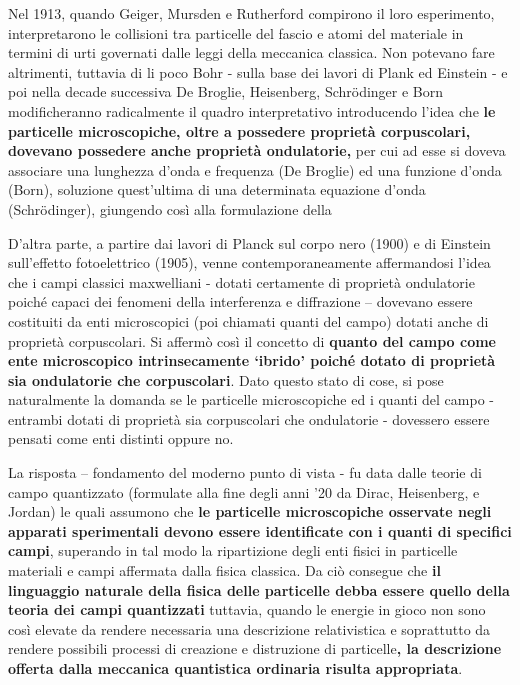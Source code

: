 Nel 1913, quando Geiger, Mursden e Rutherford compirono il loro
esperimento, interpretarono le collisioni tra particelle del fascio e
atomi del materiale in termini di urti governati dalle leggi della
meccanica classica.
Non potevano fare altrimenti, tuttavia di li poco
Bohr - sulla base dei lavori di Plank ed Einstein - e poi nella decade
successiva De Broglie, Heisenberg, Schrödinger e Born modificheranno
radicalmente il quadro interpretativo introducendo l'idea che \textbf{le
particelle microscopiche, oltre a possedere proprietà corpuscolari,
	dovevano possedere anche proprietà ondulatorie,} per cui ad esse si
doveva associare una lunghezza d'onda e frequenza (De Broglie) ed una
funzione d'onda (Born), soluzione quest'ultima di una determinata
equazione d'onda (Schrödinger), giungendo così alla formulazione della

D'altra parte, a partire dai lavori di Planck sul corpo nero (1900) e di
Einstein sull'effetto fotoelettrico (1905), venne contemporaneamente
affermandosi l'idea che i campi classici maxwelliani - dotati certamente
di proprietà ondulatorie poiché capaci dei fenomeni della interferenza e
diffrazione -- dovevano essere costituiti da enti microscopici (poi
chiamati quanti del campo) dotati anche di proprietà corpuscolari.
Si affermò così il concetto di \textbf{quanto del campo come ente
microscopico intrinsecamente `ibrido' poiché dotato di proprietà sia
ondulatorie che corpuscolari}.
Dato questo stato di cose, si pose naturalmente la domanda se le particelle microscopiche ed i quanti del campo -
entrambi dotati di proprietà sia corpuscolari che ondulatorie - dovessero essere pensati come enti distinti oppure no.

La risposta -- fondamento del moderno punto di vista - fu data dalle
teorie di campo quantizzato (formulate alla fine degli anni '20 da
Dirac, Heisenberg, e Jordan) le quali assumono che \textbf{le particelle
microscopiche osservate negli apparati sperimentali devono essere
identificate con i quanti di specifici campi}, superando in tal modo la
ripartizione degli enti fisici in particelle materiali e campi affermata
dalla fisica classica.
Da ciò consegue che \textbf{il linguaggio
naturale della fisica delle particelle debba essere quello della teoria
dei campi quantizzati} tuttavia, quando le energie in gioco non sono
così elevate da rendere necessaria una descrizione relativistica e
soprattutto da rendere possibili processi di creazione e distruzione di
particelle\textbf{, la descrizione offerta dalla meccanica quantistica
ordinaria risulta appropriata}.

